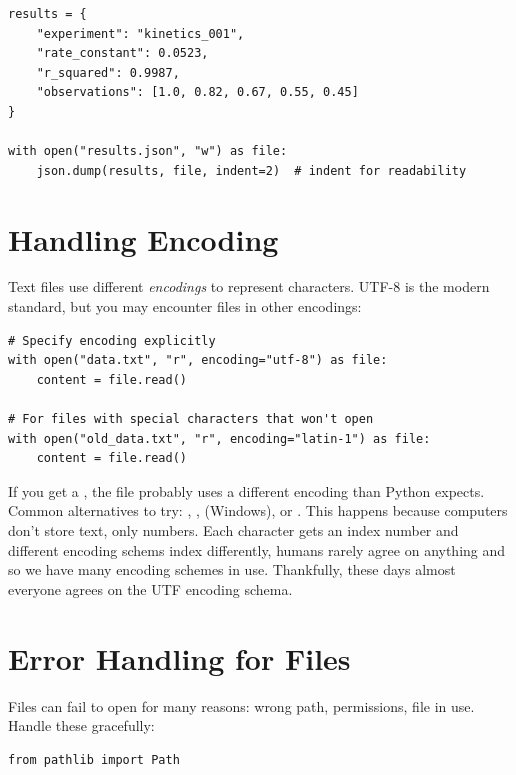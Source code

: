 \begin{labexample}
\begin{lstlisting}
results = {
    "experiment": "kinetics_001",
    "rate_constant": 0.0523,
    "r_squared": 0.9987,
    "observations": [1.0, 0.82, 0.67, 0.55, 0.45]
}

with open("results.json", "w") as file:
    json.dump(results, file, indent=2)  # indent for readability
\end{lstlisting}

\section{Handling Encoding}
\label{sec:encoding}

Text files use different \emph{encodings} to represent characters. UTF-8 is the modern standard, but you may encounter files in other encodings:

\begin{lstlisting}
# Specify encoding explicitly
with open("data.txt", "r", encoding="utf-8") as file:
    content = file.read()

# For files with special characters that won't open
with open("old_data.txt", "r", encoding="latin-1") as file:
    content = file.read()
\end{lstlisting}

\begin{warning}
If you get a , the file probably uses a different encoding than Python expects. Common alternatives to try: , ,  (Windows), or . This happens because computers don't store text, only numbers. Each character gets an index number and different encoding schems index differently, humans rarely agree on anything and so we have many encoding schemes in use. Thankfully, these days almost everyone agrees on the UTF encoding schema.
\end{warning}

\section{Error Handling for Files}
\label{sec:file-errors}

Files can fail to open for many reasons: wrong path, permissions, file in use. Handle these gracefully:

\begin{lstlisting}
from pathlib import Path


\end{lstlisting}
\end{labexample}
